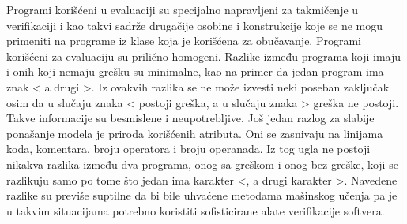 \documentclass[12pt,oneside]{memoir}
\begin{document}
Programi korišćeni u evaluaciji su specijalno napravljeni za takmičenje u verifikaciji i kao takvi sadrže drugačije osobine i konstrukcije koje se ne mogu primeniti na programe iz klase koja je korišćena za obučavanje. Programi korišćeni za evaluaciju su prilično homogeni. Razlike između programa koji imaju i onih koji nemaju grešku su minimalne, kao na primer da jedan program ima znak < a drugi >. Iz ovakvih razlika se ne može izvesti neki poseban zaključak osim da u slučaju znaka < postoji greška, a u slučaju znaka > greška ne postoji. Takve informacije su besmislene i neupotrebljive. Još jedan razlog za slabije ponašanje modela je priroda korišćenih atributa. Oni se zasnivaju na linijama koda, komentara, broju operatora i broju operanada. Iz tog ugla ne postoji nikakva razlika između dva programa, onog sa greškom i onog bez greške, koji se razlikuju samo po tome što jedan ima karakter <, a drugi karakter >. Navedene razlike su previše suptilne da bi bile uhvaćene metodama mašinskog učenja pa je u takvim situacijama potrebno koristiti sofisticirane alate verifikacije softvera.









\end{document}
